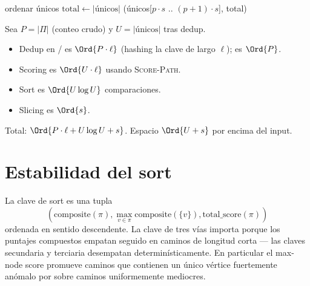 \begin{algorithm}
\caption{\textsc{Score-And-Paginate}}\label{alg:score-paginate}
ordenar únicos\;
$\text{total} \gets |\text{únicos}|$\;
\Return (únicos[$p \cdot s$ .. $(p+1) \cdot s$], total)\;
\end{algorithm}

\begin{complexity}
Sea $P = |\Pi|$ (conteo crudo) y $U = |\text{únicos}|$ tras
dedup.
\begin{itemize}
    \item Dedup en / es
        $\Ord{P \cdot \ell}$ (hashing la clave de largo $\ell$);
         es $\Ord{P}$.
    \item Scoring es $\Ord{U \cdot \ell}$ usando \textsc{Score-Path}.
    \item Sort es $\Ord{U \log U}$ comparaciones.
    \item Slicing es $\Ord{s}$.
\end{itemize}
Total: $\Ord{P \cdot \ell + U \log U + s}$. Espacio $\Ord{U + s}$
por encima del input.
\end{complexity}

\section{Estabilidad del sort}

La clave de sort es una tupla
\[
    (\mathrm{composite}(\pi), \max_{v \in \pi}\mathrm{composite}(\{v\}),
     \mathrm{total\_score}(\pi))
\]
ordenada en sentido descendente. La clave de tres vías importa
porque los puntajes compuestos empatan seguido en caminos de
longitud corta --- las claves secundaria y terciaria desempatan
determinísticamente. En particular el max-node score promueve
caminos que contienen un único vértice fuertemente anómalo por
sobre caminos uniformemente mediocres.

